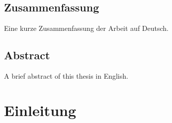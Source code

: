 \documentclass[%
thesis=student,%
coverpage=false,%
titlepage=false,%
headmarks=true, %
german,%
font=libertine, %
math=newpxtx, %
BCOR=5mm,%
coverBCOR=11mm%
]{tumbook}
\theoremstyle{break}
\begin{document}
\cleardoublepage{}

\tableofcontents

\section{Zusammenfassung}
Eine kurze Zusammenfassung der Arbeit auf Deutsch.

\section*{Abstract}
A brief abstract of this thesis in English.

\chapter{Einleitung}
\end{document}
